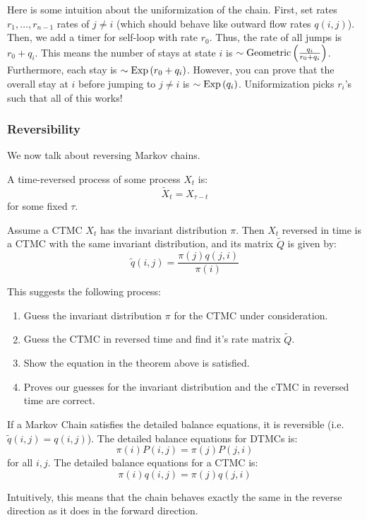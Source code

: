 Here is some intuition about the uniformization of the chain. First, set rates $r_1, \dots, r_{n - 1}$ rates of $j \neq i$ (which should behave like outward flow rates $q(i, j)$).
Then, we add a timer for self-loop with rate $r_0$. Thus, the rate of all jumps is $r_0 + q_i$. This means the number of stays at state $i$ is
$\Geo{\empty}{\frac{q_i}{r_0 + q_i}}$. Furthermore, each stay is $\Expo{\empty}{r_0 + q_i}$. However, you can prove that the overall stay at $i$ before jumping to $j \neq i$
is $\Expo{\empty}{q_i}$. Uniformization picks $r_i$'s such that all of this works!

\subsubsection{Reversibility}
We now talk about reversing Markov chains.

\begin{definition}
    A time-reversed process of some process $X_t$ is:
    \[ \tilde{X}_t = X_{\tau - t} \]
    for some fixed $\tau$.
\end{definition}

\begin{theorem}
    Assume a CTMC $X_t$ has the invariant distribution $\pi$. Then $X_t$ reversed in time is a CTMC
    with the same invariant distribution, and its matrix $\tilde{Q}$ is given by:
    \[ \tilde{q}(i, j) = \frac{\pi(j) q(j, i)}{\pi(i)} \]
\end{theorem}

This suggests the following process:
\begin{enumerate}
    \item Guess the invariant distribution $\pi$ for the CTMC under consideration.
    \item Guess the CTMC in reversed time and find it's rate matrix $\tilde{Q}$.
    \item Show the equation in the theorem above is satisfied.
    \item Proves our guesses for the invariant distribution and the cTMC in reversed time are correct.
\end{enumerate}

\begin{definition}[Reversibility]
    If a Markov Chain satisfies the detailed balance equations, it is reversible (i.e. $\tilde{q}(i, j) = q(i, j)$). The detailed balance equations for DTMCs is:
    \[ \pi(i) P(i, j) = \pi(j) P(j, i) \]
    for all $i, j$.
    The detailed balance equations for a CTMC is:
    \[ \pi(i) q(i, j) = \pi(j) q(j, i) \]

    Intuitively, this means that the chain behaves exactly the same in the reverse direction as it does in the forward direction.
\end{definition}

